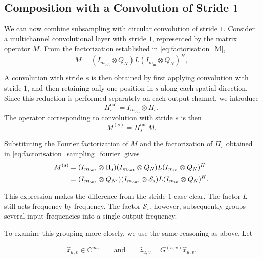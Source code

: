 \subsection{Composition with a Convolution of Stride $1$}

We can now combine subsampling with circular convolution of stride $1$.
Consider a multichannel convolutional layer with stride $1$, represented by the matrix
operator $M$. From the factorization established in \eqref{eq:factorisation_M},
\begin{equation*}
    M
    =
    (I_{m_{\mathrm{out}}} \otimes Q_N)
    L
    (I_{m_{\mathrm{in}}} \otimes Q_N)^H,
\end{equation*}

A convolution with stride $s$ is then obtained by first applying convolution with stride $1$,
and then retaining only one position in $s$ along each spatial direction. Since this reduction
is performed separately on each output channel, we introduce
\[
    \Pi_s^{\mathrm{out}}
    =
    I_{m_{\mathrm{out}}} \otimes \Pi_s.
\]
The operator corresponding to convolution with stride $s$ is then
\begin{equation*}
    M^{(s)}
    =
    \Pi_s^{\mathrm{out}} M.
\end{equation*}

Substituting the Fourier factorization of $M$ and the factorization of $\Pi_s$ obtained in
\eqref{eq:factorisation_sampling_fourier} gives
\begin{align*}
    M^{(s)}
    &=
    (I_{m_{\mathrm{out}}} \otimes \Pi_s)
    (I_{m_{\mathrm{out}}} \otimes Q_N)
    L
    (I_{m_{\mathrm{in}}} \otimes Q_N)^H \notag \\
    &=
    (I_{m_{\mathrm{out}}} \otimes Q_{N'})
    (I_{m_{\mathrm{out}}} \otimes \mathcal{S}_s)
    L
    (I_{m_{\mathrm{in}}} \otimes Q_N)^H.
\end{align*}

This expression makes the difference from the stride-$1$ case clear. The factor $L$
still acts frequency by frequency. The factor $\mathcal{S}_s$, however, subsequently groups
several input frequencies into a single output frequency.

To examine this grouping more closely, we use the same reasoning as above.
Let

\begin{equation*}
    \widehat{x}_{u,v} \in \mathbb{C}^{m_{\mathrm{in}}}
    \qquad \text{and} \qquad
    \widehat{z}_{u,v} = G^{(u,v)} \widehat{x}_{u,v}.
\end{equation*}

